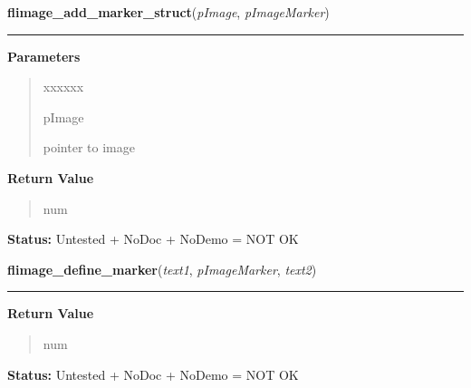 \hspace{.8\funcindent}\begin{boxedminipage}{\funcwidth}

    \raggedright \textbf{flimage\_add\_marker\_struct}(\textit{pImage}, \textit{pImageMarker})

    \vspace{-1.5ex}

    \rule{\textwidth}{0.5\fboxrule}
\setlength{\parskip}{2ex}
\setlength{\parskip}{1ex}
      \textbf{Parameters}
      \vspace{-1ex}

      \begin{quote}
        \begin{Ventry}{xxxxxx}

          \item[pImage]

          pointer to image

        \end{Ventry}

      \end{quote}

      \textbf{Return Value}
    \vspace{-1ex}

      \begin{quote}
      num

      \end{quote}

\textbf{Status:} Untested + NoDoc + NoDemo = NOT OK



    \end{boxedminipage}

    \label{xformslib:library:flimage_define_marker}

    \vspace{0.5ex}

\hspace{.8\funcindent}\begin{boxedminipage}{\funcwidth}

    \raggedright \textbf{flimage\_define\_marker}(\textit{text1}, \textit{pImageMarker}, \textit{text2})

    \vspace{-1.5ex}

    \rule{\textwidth}{0.5\fboxrule}
\setlength{\parskip}{2ex}
\setlength{\parskip}{1ex}
      \textbf{Return Value}
    \vspace{-1ex}

      \begin{quote}
      num

      \end{quote}

\textbf{Status:} Untested + NoDoc + NoDemo = NOT OK



    \end{boxedminipage}

